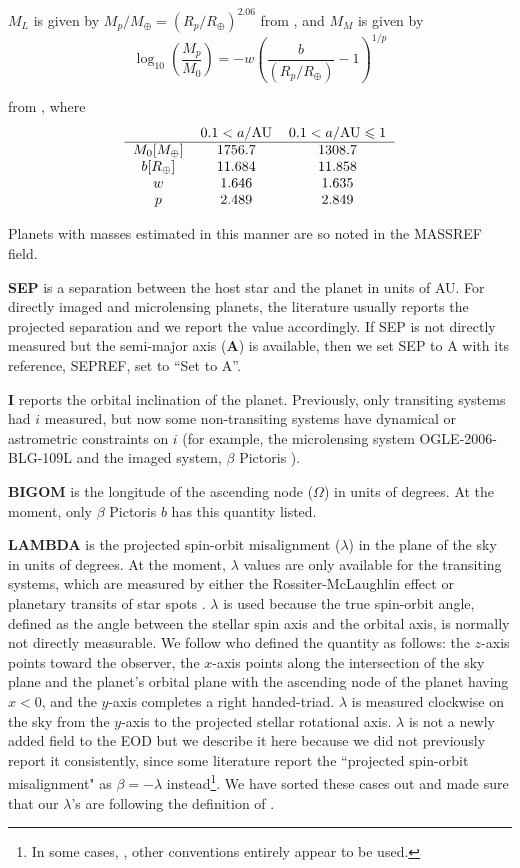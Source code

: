 \documentclass[11pt,preprint]{aastex}
\def\leq{\leqslant}
\def\rearth{R_\oplus}
\def\mearth{M_\oplus}
\begin{document}
\begin{CJK*}{UTF8}{gbsn}
$M_L$ is given by $M_{p}/\mearth=\left(R_{p}/\rearth\right)^{2.06}$ from \cite{Lissauer2011}, and $M_M$ is given by 
\[
\log_{10}\left(\frac{M_{p}}{M_0}\right)=-w\left(\frac{b}{\left(R_{p}/\rearth\right)}-1\right)^{1/p}
\]

\noindent from \cite{Mordasini2012}, where
\[
\begin{tabular}{ c c c }
  & $0.1<a/{\rm AU}$ & $0.1<a/{\rm AU} \leq 1$  \\ \hline $M_0[\mearth]$ & 1756.7 & 1308.7 \\
$b[\rearth]$ & 11.684 & 11.858 \\ $w$ & 1.646 & 1.635 \\ $p$ & 2.489 & 2.849 \\ 
\end{tabular}
\]

Planets with masses estimated in this manner are so noted in the
MASSREF field.

{\bf SEP} is a separation between the host star
and the planet in units of AU. For directly imaged and microlensing planets, the
literature usually reports the projected separation and we report the
value accordingly.  If SEP is not directly measured but the semi-major
axis ({\bf A}) is available, then we set SEP to A with its reference,
SEPREF, set to ``Set to A''. 

{\bf I} reports the orbital inclination of the planet. Previously, only transiting
systems had $i$ measured, but now some non-transiting systems have
dynamical or astrometric constraints on $i$ (for example, the
microlensing system OGLE-2006-BLG-109L \citep{Bennett2010} and the imaged system, $\beta$ Pictoris \citep{Lagrange2009}).

{\bf BIGOM} is the longitude of the ascending node ($\Omega$) in units
of degrees. At the moment, only $\beta$ Pictoris $b$ has this quantity listed.

{\bf LAMBDA} is the projected spin-orbit misalignment ($\lambda$) in
the plane of the sky in units of degrees. At the moment, $\lambda$
values are only available for the transiting systems, which are
measured by either the Rossiter-McLaughlin effect
\citep[e.g.,][]{Winn2005} or planetary transits of star spots
\citep[e.g.,][]{Sanchis-Ojeda2012}. $\lambda$ is used because
the true spin-orbit angle, defined as the angle between the
stellar spin axis and the orbital axis, is normally not directly
measurable. We follow \cite{Fabrycky2009} who defined the quantity as follows: the
$z$-axis points toward the observer, the $x$-axis points along the
intersection of the sky plane and the planet's orbital plane with the
ascending node of the planet having $x<0$, and the $y$-axis completes
a right handed-triad. $\lambda$ is measured clockwise on the sky from
the $y$-axis to the projected stellar rotational axis. $\lambda$ is
not a newly added field to the EOD but we describe it here because we did not
previously report it consistently, since some literature report the ``projected
spin-orbit misalignment" as $\beta = -\lambda$ instead\footnote{In some cases, \citep[e.g.][]{Moutou2011}, other conventions entirely appear to be used.}. We have sorted
these cases out and made sure that our $\lambda$'s are following the
definition of \cite{Fabrycky2009}.


\end{CJK*}
\end{document}
